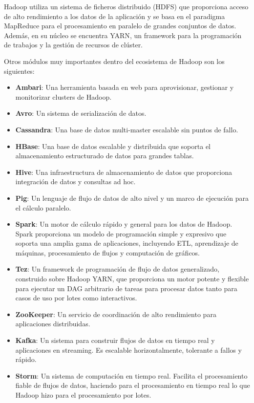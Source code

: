 Hadoop utiliza un sistema de ficheros distribuido (HDFS) que proporciona acceso de alto rendimiento a los datos de la aplicación y se basa en el paradigma MapReduce para el procesamiento en paralelo de grandes conjuntos de datos. Además, en su núcleo se encuentra YARN\cite{yarn}, un framework para la programación de trabajos y la gestión de recursos de clúster. 

Otros módulos muy importantes dentro del ecosistema de Hadoop son los siguientes: 
\begin{itemize}
    \item \textbf{Ambari}\cite{ambari}: Una herramienta basada en web para aprovisionar, gestionar y monitorizar clusters de Hadoop. 
    \item \textbf{Avro}\cite{avro}: Un sistema de serialización de datos. 
    \item \textbf{Cassandra}\cite{cassandra}: Una base de datos multi-master escalable sin puntos de fallo. 
    \item \textbf{HBase}\cite{hbase}: Una base de datos escalable y distribuida que soporta el almacenamiento estructurado de datos para grandes tablas. 
    \item \textbf{Hive}\cite{hive}: Una infraestructura de almacenamiento de datos que proporciona integración de datos y consultas ad hoc. 
    \item \textbf{Pig}\cite{pig}: Un lenguaje de flujo de datos de alto nivel y un marco de ejecución para el cálculo paralelo. 
    \item \textbf{Spark}\cite{spark}: Un motor de cálculo rápido y general para los datos de Hadoop. Spark proporciona un modelo de programación simple y expresivo que soporta una amplia gama de aplicaciones, incluyendo ETL, aprendizaje de máquinas, procesamiento de flujos y computación de gráficos. 
    \item \textbf{Tez}\cite{tez}: Un framework de programación de flujo de datos generalizado, construido sobre Hadoop YARN, que proporciona un motor potente y flexible para ejecutar un DAG arbitrario de tareas para procesar datos tanto para casos de uso por lotes como interactivos. 
    \item \textbf{ZooKeeper}\cite{zookeeper}: Un servicio de coordinación de alto rendimiento para aplicaciones distribuidas. 
    \item \textbf{Kafka}\cite{Kafka}: Un sistema para construir flujos de datos en tiempo real y aplicaciones en streaming. Es escalable horizontalmente, tolerante a fallos y rápido. 
    \item \textbf{Storm}\cite{storm}: Un sistema de computación en tiempo real. Facilita el procesamiento fiable de flujos de datos, haciendo para el procesamiento en tiempo real lo que Hadoop hizo para el procesamiento por lotes. 
\end{itemize}

